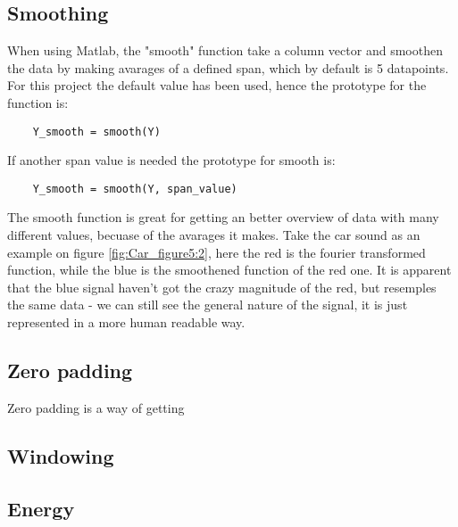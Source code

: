 \subsection{Smoothing}

When using Matlab, the "smooth" function take a column vector and smoothen the data by making avarages of a defined span, which by default is 5 datapoints\cite[smooth]{MATLAB_DOC}. 
For this project the default value has been used, hence the prototype for the function is:

\begin{verbatim}
	Y_smooth = smooth(Y)
\end{verbatim}

If another span value is needed the prototype for smooth is:


\begin{verbatim}
	Y_smooth = smooth(Y, span_value)
\end{verbatim}

The smooth function is great for getting an better overview of data with many different values, becuase of the avarages it makes. 
Take the car sound as an example on figure \ref{fig:Car_figure5:2}, here the red is the fourier transformed function, while the blue is the smoothened function of the red one. 
It is apparent that the blue signal haven't got the crazy magnitude of the red, but resemples the same data - we can still see the general nature of the signal, it is just represented in a more human readable way.

\subsection{Zero padding}

Zero padding is a way of getting 

\subsection{Windowing}

\subsection{Energy}